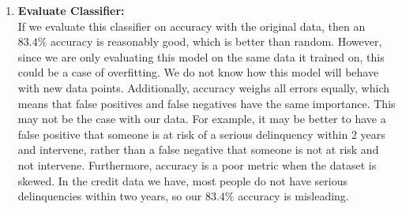\documentclass[letterpaper,12pt]{article}
\begin{document}
\begin{enumerate}
\item \textbf{Evaluate Classifier:} \\
If we evaluate this classifier on accuracy with the original data, then an $83.4\%$ accuracy is reasonably good, which is better than random. However, since we are only evaluating this model on the same data it trained on, this could be a case of overfitting. We do not know how this model will behave with new data points. Additionally, accuracy weighs all errors equally, which means that false positives and false negatives have the same importance. This may not be the case with our data. For example, it may be better to have a false positive that someone is at risk of a serious delinquency within 2 years and intervene, rather than a false negative that someone is not at risk and not intervene. Furthermore, accuracy is a poor metric when the dataset is skewed. In the credit data we have, most people do not have serious delinquencies within two years, so our $83.4 \%$ accuracy is misleading. 
\end{enumerate}
\end{document}
